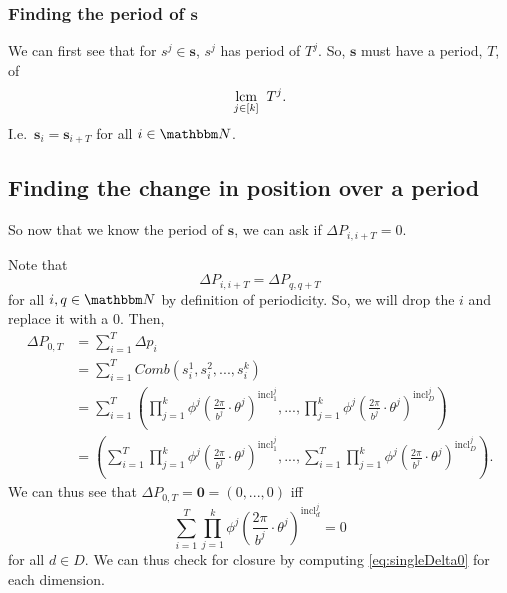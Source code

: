 \documentclass[11pt,titlepage]{article}
\newcommand{\statePeriod}{T^j}
\newcommand{\stateNotime}[1]{s^{#1}}
\newcommand{\totalPeriod}{T}
\newcommand{\totalStateNotime}{\pmb{s}}
\newcommand{\combWithState}[1]{Comb\left(s^1_{#1}, s^2_{#1}, ..., s^k_{#1}\right)}
\newcommand{\inclIndic}[2]{{\mathrm{incl}_{#1}^{#2}}}
\newcommand{\numbToAngle}{\frac{2\pi}{b^j}}
\newcommand{\sinOrCos}{\phi^j}
\newcommand{\combSingleTerm}[1]{\prod_{j=1}^k \sinOrCos\left(\numbToAngle \cdot \theta^j\right) ^ {\inclIndic{#1}{j}}}
\begin{document}
\subsubsection{Finding the period of $\pmb{s}$}
We can first see that for $\stateNotime{j} \in \pmb{s}$, $\stateNotime{j}$
has period of $\statePeriod$. So, $\pmb{s}$ must have a period, $\totalPeriod$, of
$$
\underset{j \in [k]}{\operatorname{lcm}}\;\; T^j.
$$
I.e.\ $\pmb{s}_i = \pmb{s}_{i + T}$ for all $i \in \N$.







\subsection{Finding the change in position over a period}
So now that we know the period of $\totalStateNotime$, we can ask if
$\Delta P_{i, i + T} = 0$. %

Note that 
$$
\Delta P_{i, i + T} = \Delta P_{q, q + T}
$$
for all $i, q \in \N$ by definition of periodicity.
So, we will drop the $i$ and replace it with a $0$.
Then,
\begin{align*}
  \Delta P_{0, T} &= \sum_{i = 1}^T \Delta p_i \\
  &= \sum_{i = 1}^T \combWithState{i} \\
  &= \sum_{i = 1}^T \left(\combSingleTerm{1}, ..., \combSingleTerm{D}\right) \\
  &= \left(\sum_{i = 1}^T \combSingleTerm{1}, ..., \sum_{i = 1}^T \combSingleTerm{D}\right).
\end{align*}
We can thus see that $\Delta P_{0, T} = \pmb{0} = (0, ..., 0)$ iff 
\begin{equation}
\label{eq:singleDelta0}
\sum_{i = 1}^T \combSingleTerm{d} = 0
\end{equation}
for all $d \in D$.
We can thus check for closure by computing \eqref{eq:singleDelta0} for each dimension.
\end{document}
